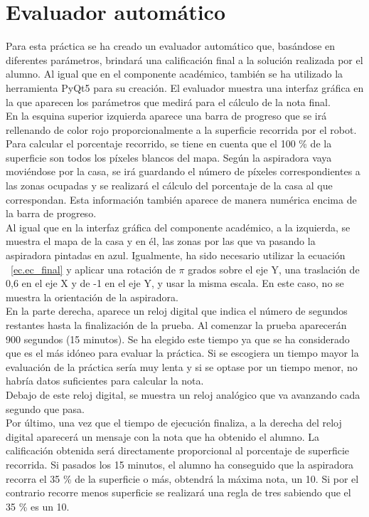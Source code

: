 \section{Evaluador automático} 
Para esta práctica se ha creado un evaluador automático que, basándose en diferentes parámetros, brindará una calificación final a la solución realizada por el alumno. Al igual que en el componente académico, también se ha utilizado la herramienta PyQt5 para su creación. El evaluador muestra una interfaz gráfica en la que aparecen los parámetros que medirá para el cálculo de la nota final.\\

En la esquina superior izquierda aparece una barra de progreso que se irá rellenando de color rojo proporcionalmente a la superficie recorrida por el robot. Para calcular el porcentaje recorrido, se tiene en cuenta que el 100 \% de la superficie son todos los píxeles blancos del mapa. Según la aspiradora vaya moviéndose por la casa, se irá guardando el número de píxeles correspondientes a las zonas ocupadas y se realizará el cálculo del porcentaje de la casa al que correspondan. Esta información también aparece de manera numérica encima de la barra de progreso.\\

Al igual que en la interfaz gráfica del componente académico, a la izquierda, se muestra el mapa de la casa y en él, las zonas por las que va pasando la aspiradora pintadas en azul. Igualmente, ha sido necesario utilizar la ecuación ~\ref{ec.ec_final} y aplicar una rotación de \(\pi\) grados sobre el eje Y, una traslación de 0,6 en el eje X y de -1 en el eje Y, y usar la misma escala. En este caso, no se muestra la orientación de la aspiradora.\\

En la parte derecha, aparece un reloj digital que indica el número de segundos restantes hasta la finalización de la prueba. Al comenzar la prueba aparecerán 900 segundos (15 minutos). Se ha elegido este tiempo ya que se ha considerado que es el más idóneo para evaluar la práctica. Si se escogiera un tiempo mayor la evaluación de la práctica sería muy lenta y si se optase por un tiempo menor, no habría datos suficientes para calcular la nota. \\

Debajo de este reloj digital, se muestra un reloj analógico que va avanzando cada segundo que pasa. \\


Por último, una vez que el tiempo de ejecución finaliza, a la derecha del reloj digital aparecerá un mensaje con la nota que ha obtenido el alumno. La calificación obtenida será directamente proporcional al porcentaje de superficie recorrida. Si pasados los 15 minutos, el alumno ha conseguido que la aspiradora recorra el 35 \% de la superficie o más, obtendrá la máxima nota, un 10. Si por el contrario recorre menos superficie se realizará una regla de tres sabiendo que el 35 \% es un 10.\\

